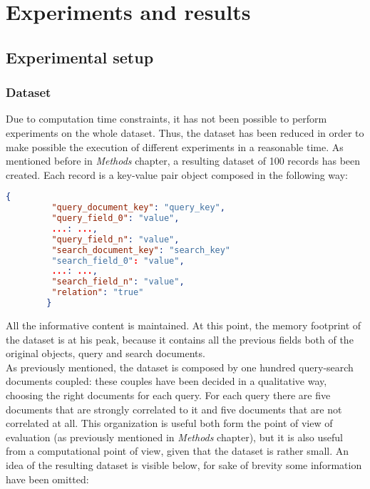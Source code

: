 \documentclass[\main/main.tex]{subfiles}
\begin{document}
\chapter{Experiments and results}
\section{Experimental setup}
\subsection{Dataset}
Due to computation time constraints, it has not been possible to perform experiments on the whole dataset. Thus, the dataset has been reduced in order to make possible the execution of different experiments in a reasonable time. As mentioned before in \emph{Methods} chapter, a resulting dataset of 100 records has been created. Each record is a key-value pair object composed in the following way:
\begin{center}
    \begin{lstlisting}[language=json, caption="Experimental dataset object", captionpos=b]
        {
         "query_document_key": "query_key",
         "query_field_0": "value",
         ...: ...,
         "query_field_n": "value",
         "search_document_key": "search_key"
         "search_field_0": "value",
         ...: ...,
         "search_field_n": "value",
         "relation": "true"
        }
    \end{lstlisting}
\end{center}
All the informative content is maintained. At this point, the memory footprint of the dataset is at his peak, because it contains all the previous fields both of the original objects, query and search documents.\\
As previously mentioned, the dataset is composed by one hundred query-search documents coupled: these couples have been decided in a qualitative way, choosing the right documents for each query. For each query there are five documents that are strongly correlated to it and five documents that are not correlated at all. This organization is useful both form the point of view of evaluation (as previously mentioned in \emph{Methods} chapter), but it is also useful from a computational point of view, given that the dataset is rather small.
An idea of the resulting dataset is visible below, for sake of brevity some information have been omitted:
\end{document}
